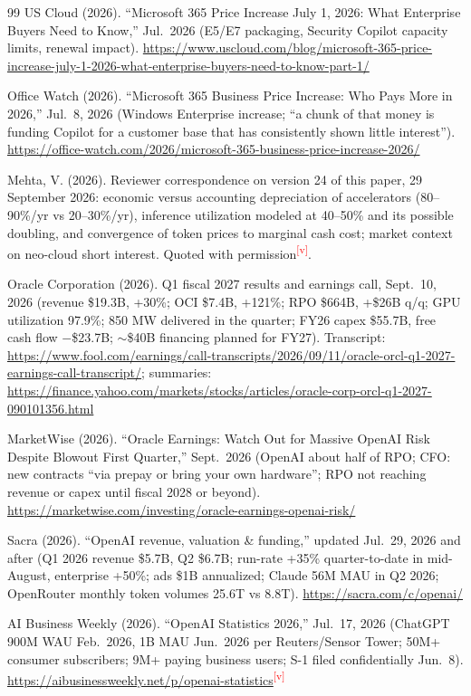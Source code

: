 \documentclass[11pt,letterpaper]{article}
\newcommand{\verify}{\textsuperscript{\textcolor{red}{[v]}}}
\begin{document}
\begin{thebibliography}{99}
US Cloud (2026). ``Microsoft 365 Price Increase July 1, 2026: What Enterprise Buyers Need to Know,'' Jul.~2026 (E5/E7 packaging, Security Copilot capacity limits, renewal impact). \url{https://www.uscloud.com/blog/microsoft-365-price-increase-july-1-2026-what-enterprise-buyers-need-to-know-part-1/}

Office Watch (2026). ``Microsoft 365 Business Price Increase: Who Pays More in 2026,'' Jul.~8, 2026 (Windows Enterprise increase; ``a chunk of that money is funding Copilot for a customer base that has consistently shown little interest''). \url{https://office-watch.com/2026/microsoft-365-business-price-increase-2026/}

Mehta, V. (2026). Reviewer correspondence on version 24 of this paper, 29 September 2026: economic versus accounting depreciation of accelerators (80--90\%/yr vs 20--30\%/yr), inference utilization modeled at 40--50\% and its possible doubling, and convergence of token prices to marginal cash cost; market context on neo-cloud short interest. Quoted with permission\verify.

Oracle Corporation (2026). Q1 fiscal 2027 results and earnings call, Sept.~10, 2026 (revenue \$19.3B, +30\%; OCI \$7.4B, +121\%; RPO \$664B, +\$26B q/q; GPU utilization 97.9\%; 850 MW delivered in the quarter; FY26 capex \$55.7B, free cash flow $-$\$23.7B; $\sim$\$40B financing planned for FY27). Transcript: \url{https://www.fool.com/earnings/call-transcripts/2026/09/11/oracle-orcl-q1-2027-earnings-call-transcript/}; summaries: \url{https://finance.yahoo.com/markets/stocks/articles/oracle-corp-orcl-q1-2027-090101356.html}

MarketWise (2026). ``Oracle Earnings: Watch Out for Massive OpenAI Risk Despite Blowout First Quarter,'' Sept.~2026 (OpenAI about half of RPO; CFO: new contracts ``via prepay or bring your own hardware''; RPO not reaching revenue or capex until fiscal 2028 or beyond). \url{https://marketwise.com/investing/oracle-earnings-openai-risk/}

Sacra (2026). ``OpenAI revenue, valuation \& funding,'' updated Jul.~29, 2026 and after (Q1 2026 revenue \$5.7B, Q2 \$6.7B; run-rate +35\% quarter-to-date in mid-August, enterprise +50\%; ads \$1B annualized; Claude 56M MAU in Q2 2026; OpenRouter monthly token volumes 25.6T vs 8.8T). \url{https://sacra.com/c/openai/}

AI Business Weekly (2026). ``OpenAI Statistics 2026,'' Jul.~17, 2026 (ChatGPT 900M WAU Feb.~2026, 1B MAU Jun.~2026 per Reuters/Sensor Tower; 50M+ consumer subscribers; 9M+ paying business users; S-1 filed confidentially Jun.~8). \url{https://aibusinessweekly.net/p/openai-statistics}\verify


\end{thebibliography}
\end{document}
